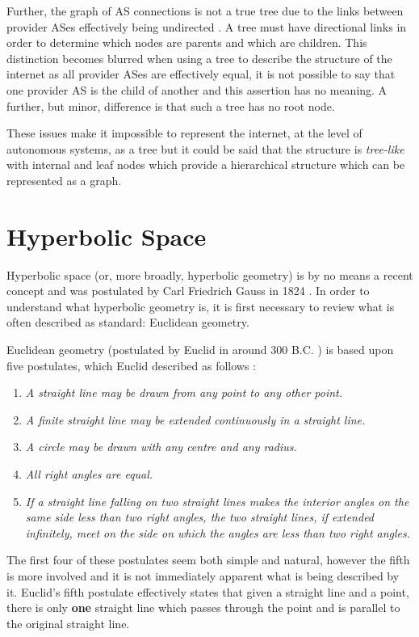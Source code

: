 Further, the graph of AS connections is not a true tree due to the links between provider ASes effectively being undirected \cite{di_battista_computing_2003}. A tree must have directional links in order to determine which nodes are parents and which are children. This distinction becomes blurred when using a tree to describe the structure of the internet as all provider ASes are effectively equal, it is not possible to say that one provider AS is the child of another and this assertion has no meaning. A further, but minor, difference is that such a tree has no root node. 

These issues make it impossible to represent the internet, at the level of autonomous systems, as a tree but it could be said that the structure is \textit{tree-like} with internal and leaf nodes which provide a hierarchical structure which can be represented as a graph.

\section{Hyperbolic Space}
\label{sec:LitReviewHyperbolicSpace}
Hyperbolic space (or, more broadly, hyperbolic geometry) is by no means a recent concept and was postulated by Carl Friedrich Gauss in 1824 \cite{ratcliffe_foundations_2006}. In order to understand what hyperbolic geometry is, it is first necessary to review what is often described as standard: Euclidean geometry.

Euclidean geometry (postulated by Euclid in around 300 B.C. \cite{ratcliffe_foundations_2006}) is based upon five postulates, which Euclid described as follows \cite{ratcliffe_foundations_2006}:
\begin{enumerate}
\item \textit{A straight line may be drawn from any point to any other point.}
\item \textit{A finite straight line may be extended continuously in a straight line.}
\item \textit{A circle may be drawn with any centre and any radius.}
\item \textit{All right angles are equal.}
\item \textit{If a straight line falling on two straight lines makes the interior angles on the same side less than two right angles, the two straight lines, if extended infinitely, meet on the side on which the angles are less than two right angles.}
\end{enumerate}

The first four of these postulates seem both simple and natural, however the fifth is more involved and it is not immediately apparent what is being described by it. Euclid's fifth postulate effectively states that given a straight line and a point, there is only \textbf{one} straight line which passes through the point and is parallel to the original straight line. 

